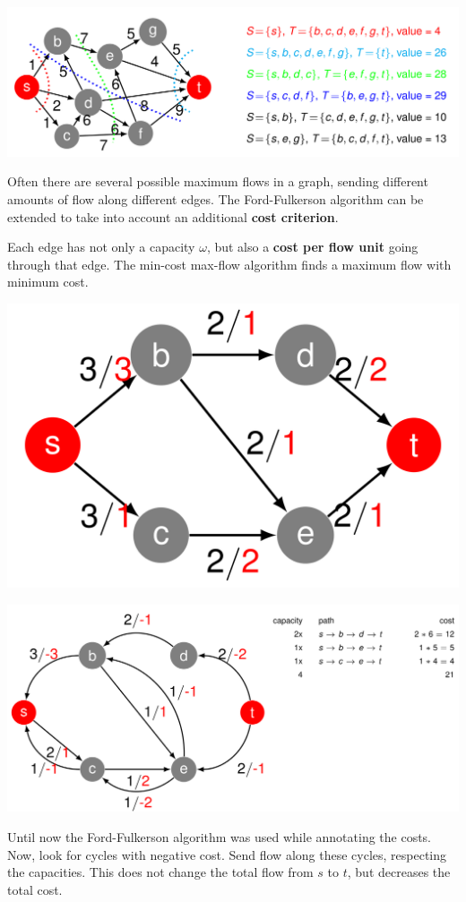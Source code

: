 \documentclass[11pt]{article}
\begin{document}
\begin{center}
	\includegraphics[width=0.8\linewidth]{img/max_flow_min_cut}
\end{center}

Often there are several possible maximum flows in a graph, sending different amounts of flow along different edges. The Ford-Fulkerson algorithm can be extended to take into account an additional {\color{Red1}\textbf{cost criterion}}.

Each edge has not only a capacity $\omega$, but also a {\color{Red1}\textbf{cost per flow unit}} going through that edge. The min-cost max-flow algorithm finds a maximum flow with minimum cost.

\begin{center}
	\includegraphics[width=0.4\linewidth]{img/cost_per_flow}
\end{center}

\begin{center}
	\includegraphics[width=0.7\linewidth]{img/cost_per_flow_algorithm}
\end{center}

Until now the Ford-Fulkerson algorithm was used while annotating the costs. Now, look for cycles with negative cost. Send flow along these cycles, respecting the capacities. This does not change the total flow from $s$ to $t$, but decreases the total cost.
\end{document}

